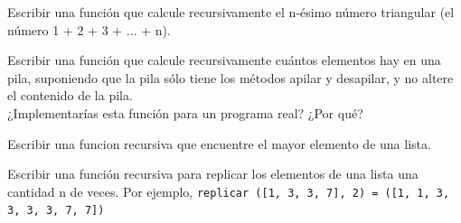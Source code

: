 \begin{ejercicio}
Escribir una función que calcule recursivamente el n-ésimo número
triangular (el número 1 + 2 + 3 + ... + n).
\end{ejercicio}

\begin{ejercicio}
Escribir una función que calcule recursivamente cuántos elementos
hay en una pila, suponiendo que la pila sólo tiene los métodos apilar
y desapilar, y no altere el contenido de la pila.\\
¿Implementarías esta función para un programa real? ¿Por qué?
\end{ejercicio}

\begin{ejercicio}
Escribir una funcion recursiva que encuentre el mayor elemento de una lista.
\end{ejercicio}

\begin{ejercicio}
Escribir una función recursiva para replicar los elementos de una lista
una cantidad n de veces. Por ejemplo,
\verb!replicar ([1, 3, 3, 7], 2) = ([1, 1, 3, 3, 3, 3, 7, 7])!
\end{ejercicio}

